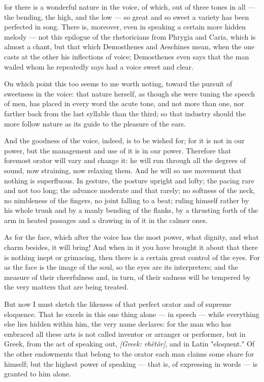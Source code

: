  for there is a wonderful nature in the voice, of which, out of three tones in all — the bending, the high, and the low — so great and so sweet a variety has been perfected in song. There is, moreover, even in speaking a certain more hidden melody — not this epilogue of the rhetoricians from Phrygia and Caria, which is almost a chant, but that which Demosthenes and Aeschines mean, when the one casts at the other his inflections of voice; Demosthenes even says that the man wailed whom he repeatedly says had a voice sweet and clear.

 On which point this too seems to me worth noting, toward the pursuit of sweetness in the voice: that nature herself, as though she were tuning the speech of men, has placed in every word the acute tone, and not more than one, nor farther back from the last syllable than the third; so that industry should the more follow nature as its guide to the pleasure of the ears.

 And the goodness of the voice, indeed, is to be wished for; for it is not in our power, but the management and use of it is in our power. Therefore that foremost orator will vary and change it: he will run through all the degrees of sound, now straining, now relaxing them. And he will so use movement that nothing is superfluous. In gesture, the posture upright and lofty; the pacing rare and not too long; the advance moderate and that rarely; no softness of the neck, no nimbleness of the fingers, no joint falling to a beat; ruling himself rather by his whole trunk and by a manly bending of the flanks, by a thrusting forth of the arm in heated passages and a drawing in of it in the calmer ones.

 As for the face, which after the voice has the most power, what dignity, and what charm besides, it will bring! And when in it you have brought it about that there is nothing inept or grimacing, then there is a certain great control of the eyes. For as the face is the image of the soul, so the eyes are its interpreters; and the measure of their cheerfulness and, in turn, of their sadness will be tempered by the very matters that are being treated.

 But now I must sketch the likeness of that perfect orator and of supreme eloquence. That he excels in this one thing alone — in speech — while everything else lies hidden within him, the very name declares: for the man who has embraced all these arts is not called inventor or arranger or performer, but in Greek, from the act of speaking out, \textit{[Greek: rhêtôr]}, and in Latin "eloquent." Of the other endowments that belong to the orator each man claims some share for himself; but the highest power of speaking — that is, of expressing in words — is granted to him alone.

